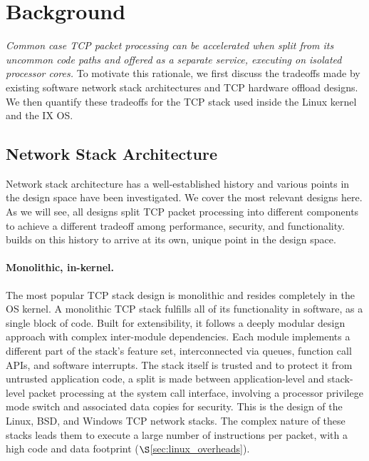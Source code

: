 \section{Background}\label{sec:background}

\emph{Common case TCP packet processing can be accelerated when split
  from its uncommon code paths and offered as a separate service,
  executing on isolated processor cores.} To motivate this rationale,
we first discuss the tradeoffs made by existing software network stack
architectures and TCP hardware offload designs. We then quantify these
tradeoffs for the TCP stack used inside the Linux kernel and the IX
OS.

\subsection{Network Stack Architecture}

Network stack architecture has a well-established history and various
points in the design space have been investigated. We cover the most
relevant designs here. As we will see, all designs split TCP packet
processing into different components to achieve a different tradeoff
among performance, security, and functionality. \taas builds on this
history to arrive at its own, unique point in the design space.

\paragraph{Monolithic, in-kernel.} The most popular TCP stack design
is monolithic and resides completely in the OS kernel. A monolithic
TCP stack fulfills all of its functionality in software, as a single
block of code. Built for extensibility, it follows a deeply modular
design approach with complex inter-module dependencies. Each module
implements a different part of the stack's feature set, interconnected
via queues, function call APIs, and software interrupts. The stack
itself is trusted and to protect it from untrusted application code, a
split is made between application-level and stack-level packet
processing at the system call interface, involving a processor
privilege mode switch and associated data copies for security. This is
the design of the Linux, BSD, and Windows TCP network stacks. The
complex nature of these stacks leads them to execute a large number of
instructions per packet, with a high code and data footprint
($\S$\ref{sec:linux_overheads}).

